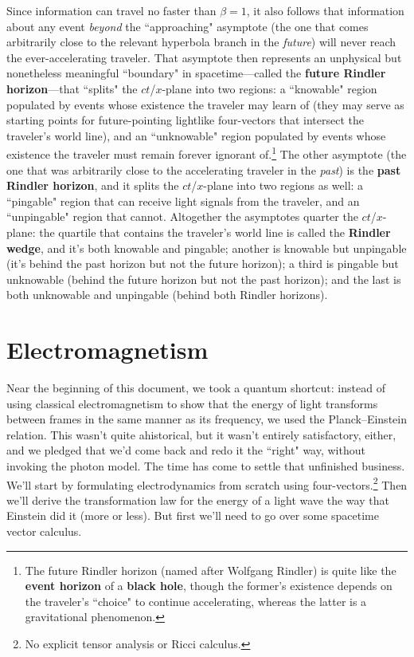 \documentclass[12pt]{article}
\begin{document}
Since information can travel no faster than $\beta = 1$, it also follows that information about any event \emph{beyond} the ``approaching" asymptote (the one that comes arbitrarily close to the relevant hyperbola branch in the \emph{future}) will never reach the ever-accelerating traveler. That asymptote then represents an unphysical but nonetheless meaningful ``boundary" in spacetime---called the \textbf{future Rindler horizon}---that ``splits" the $ct$/$x$-plane into two regions: a ``knowable" region populated by events whose existence the traveler may learn of (they may serve as starting points for future-pointing lightlike four-vectors that intersect the traveler's world line), and an ``unknowable" region populated by events whose existence the traveler must remain forever ignorant of.\footnote{The future Rindler horizon (named after Wolfgang Rindler) is quite like the \textbf{event horizon} of a \textbf{black hole}, though the former's existence depends on the traveler's ``choice" to continue accelerating, whereas the latter is a gravitational phenomenon.} The other asymptote (the one that was arbitrarily close to the accelerating traveler in the \emph{past}) is the \textbf{past Rindler horizon}, and it splits the $ct$/$x$-plane into two regions as well: a ``pingable" region that can receive light signals from the traveler, and an ``unpingable" region that cannot. Altogether the asymptotes quarter the $ct$/$x$-plane: the quartile that contains the traveler's world line is called the \textbf{Rindler wedge}, and it's both knowable and pingable; another is knowable but unpingable (it's behind the past horizon but not the future horizon); a third is pingable but unknowable (behind the future horizon but not the past horizon); and the last is both unknowable and unpingable (behind both Rindler horizons).



\section{Electromagnetism}\label{sec:rem}

Near the beginning of this document, we took a quantum shortcut: instead of using classical electromagnetism to show that the energy of light transforms between frames in the same manner as its frequency, we used the Planck--Einstein relation. This wasn't quite ahistorical, but it wasn't entirely satisfactory, either, and we pledged that we'd come back and redo it the ``right" way, without invoking the photon model. The time has come to settle that unfinished business. We'll start by formulating electrodynamics from scratch using four-vectors.\footnote{No explicit tensor analysis or Ricci calculus.} Then we'll derive the transformation law for the energy of a light wave the way that Einstein did it (more or less). But first we'll need to go over some spacetime vector calculus.
\end{document}
